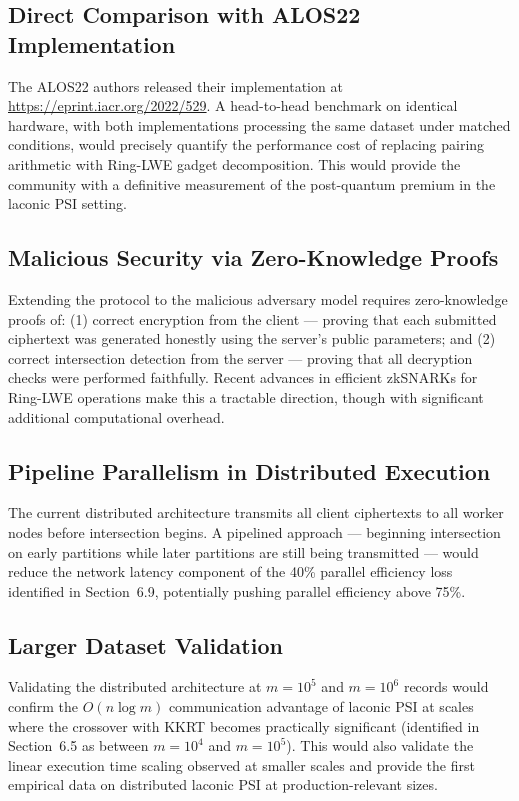 \subsection{Direct Comparison with ALOS22 Implementation}
The ALOS22 authors released their implementation at \url{https://eprint.iacr.org/2022/529}.
A head-to-head benchmark on identical hardware, with both implementations processing
the same dataset under matched conditions, would precisely quantify the performance
cost of replacing pairing arithmetic with Ring-LWE gadget decomposition. This would
provide the community with a definitive measurement of the post-quantum premium in
the laconic PSI setting.

\subsection{Malicious Security via Zero-Knowledge Proofs}
Extending the protocol to the malicious adversary model requires zero-knowledge proofs
of: (1) correct encryption from the client --- proving that each submitted ciphertext
was generated honestly using the server's public parameters; and (2) correct
intersection detection from the server --- proving that all decryption checks were
performed faithfully. Recent advances in efficient zkSNARKs for Ring-LWE operations
make this a tractable direction, though with significant additional computational overhead.

\subsection{Pipeline Parallelism in Distributed Execution}
The current distributed architecture transmits all client ciphertexts to all worker
nodes before intersection begins. A pipelined approach --- beginning intersection on
early partitions while later partitions are still being transmitted --- would reduce
the network latency component of the 40\% parallel efficiency loss identified in
Section~6.9, potentially pushing parallel efficiency above 75\%.

\subsection{Larger Dataset Validation}
Validating the distributed architecture at $m = 10^5$ and $m = 10^6$ records would
confirm the $O(n \log m)$ communication advantage of laconic PSI at scales where
the crossover with KKRT becomes practically significant (identified in Section~6.5 as
between $m = 10^4$ and $m = 10^5$). This would also validate the linear execution
time scaling observed at smaller scales and provide the first empirical data on
distributed laconic PSI at production-relevant sizes.

